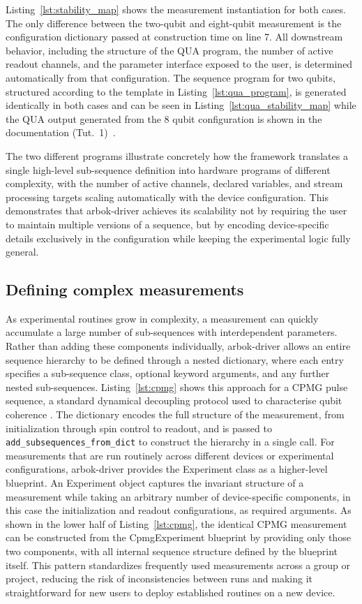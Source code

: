 \documentclass[numbers, preprint, twocolumn,10pt]{elsarticle}
\begin{document}
Listing~\ref{lst:stability_map} shows the measurement instantiation for both cases. The only difference between the two-qubit and eight-qubit measurement is the configuration dictionary passed at construction time on line 7. All downstream behavior, including the structure of the QUA program, the number of active readout channels, and the parameter interface exposed to the user, is determined automatically from that configuration. The sequence program for two qubits, structured according to the template in Listing~\ref{lst:qua_program}, is generated identically in both cases and can be seen in Listing~\ref{lst:qua_stability_map} while the QUA output generated from the 8 qubit configuration is shown in the documentation (Tut.~1)~\cite{arbok_docs}. 

The two different programs illustrate concretely how the framework translates a single high-level sub-sequence definition into hardware programs of different complexity, with the number of active channels, declared variables, and stream processing targets scaling automatically with the device configuration. This demonstrates that arbok-driver achieves its scalability not by requiring the user to maintain multiple versions of a sequence, but by encoding device-specific details exclusively in the configuration while keeping the experimental logic fully general.

\subsection{Defining complex measurements}
\noindent
As experimental routines grow in complexity, a measurement can quickly accumulate a large number of sub-sequences with interdependent parameters. Rather than adding these components individually, arbok-driver allows an entire sequence hierarchy to be defined through a nested dictionary, where each entry specifies a sub-sequence class, optional keyword arguments, and any further nested sub-sequences. Listing~\ref{lst:cpmg} shows this approach for a CPMG pulse sequence, a standard dynamical decoupling protocol used to characterise qubit coherence \cite{hahn_spin_1950, carr_effects_1954, naydenov_dynamical_2011}. The dictionary encodes the full structure of the measurement, from initialization through spin control to readout, and is passed to \texttt{add\_subsequences\_from\_dict} to construct the hierarchy in a single call.
For measurements that are run routinely across different devices or experimental configurations, arbok-driver provides the Experiment class as a higher-level blueprint. An Experiment object captures the invariant structure of a measurement while taking an arbitrary number of device-specific components, in this case the initialization and readout configurations, as required arguments. As shown in the lower half of Listing~\ref{lst:cpmg}, the identical CPMG measurement can be constructed from the CpmgExperiment blueprint by providing only those two components, with all internal sequence structure defined by the blueprint itself. This pattern standardizes frequently used measurements across a group or project, reducing the risk of inconsistencies between runs and making it straightforward for new users to deploy established routines on a new device.
\end{document}
